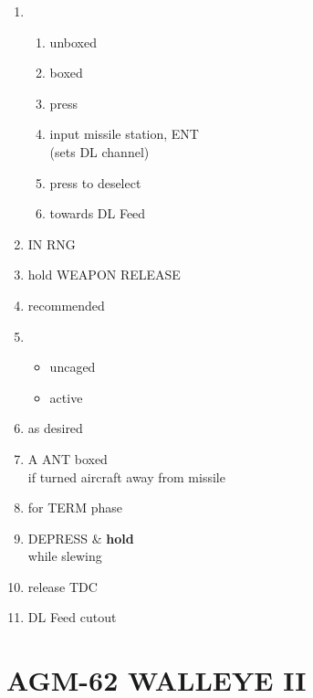 \documentclass[fontHelvetica, widesubsec]{TechCheck}
\begin{document}
	\begin{enumerate}[resume]
		\item {}
		\begin{enumerate}
			\item {}\dotfill unboxed
			\item {}\dotfill boxed
			\item {}\dotfill press
			\item {}\dotfill input missile station, ENT\\
			\hfill (sets DL channel)
			\item {}\dotfill press to deselect
			\item {}\dotfill towards DL Feed
		\end{enumerate}
		\item {}\dotfill IN RNG
		\item {}\dotfill hold WEAPON RELEASE
		\item {}\dotfill recommended
		\item {}
		\begin{itemize}
			\item {} uncaged
			\item {} active
		\end{itemize}
		\item {}\dotfill as desired
		\item {}\dotfill A ANT boxed\\
		\hfill if turned aircraft away from missile
		\item {}\dotfill for TERM phase
		\item {}\dotfill DEPRESS \& \textbf{hold}\\
		\hfill while slewing
		\item {}\dotfill release TDC
		\item {}\dotfill DL Feed cutout
	\end{enumerate}

	\section{AGM-62 WALLEYE II}
\end{document}
